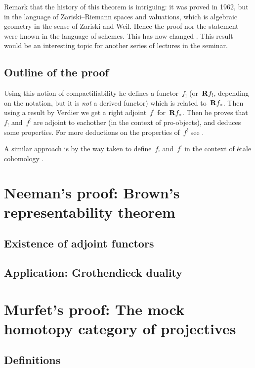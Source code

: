 \documentclass[10pt,a4paper]{article}
\begin{document}
Remark that the history of this theorem is intriguing: it was proved in 1962, but in the language of Zariski--Riemann spaces and valuations, which is algebraic geometry in the sense of Zariski and Weil. Hence the proof nor the statement were known in the language of schemes. This has now changed \cite{lutkebohmert-compactification,conrad-delignes-notes-nagata-compactification,deligne-plongement-de-nagata}. This result would be an interesting topic for another series of lectures in the seminar.

\subsection{Outline of the proof}
Using this notion of compactifiability he defines a functor~$f_!$ (or~$\mathbf{R} f_!$, depending on the notation, but it is \emph{not} a derived functor) which is related to~$\mathbf{R} f_*$. Then using a result by Verdier \cite{verdier-bourbaki-300} we get a right adjoint~$f^!$ for~$\mathbf{R} f_*$. Then he proves that~$f_!$ and~$f^!$ are adjoint to eachother (in the context of pro-objects), and deduces some properties. For more deductions on the properties of~$f^!$ see \cite{verdier-base-change-twisted-inverse-image}.

A similar approach is by the way taken to define~$f_!$ and~$f^!$ in the context of \'etale cohomology \cite[expos\'e XVII]{sga43}.

\section{Neeman's proof: Brown's representability theorem}
\label{section:neeman}
\subsection{Existence of adjoint functors}

\subsection{Application: Grothendieck duality}

\section{Murfet's proof: The mock homotopy category of projectives}
\label{section:murfet}
\subsection{Definitions}
\label{subsection:definitions}
\end{document}
